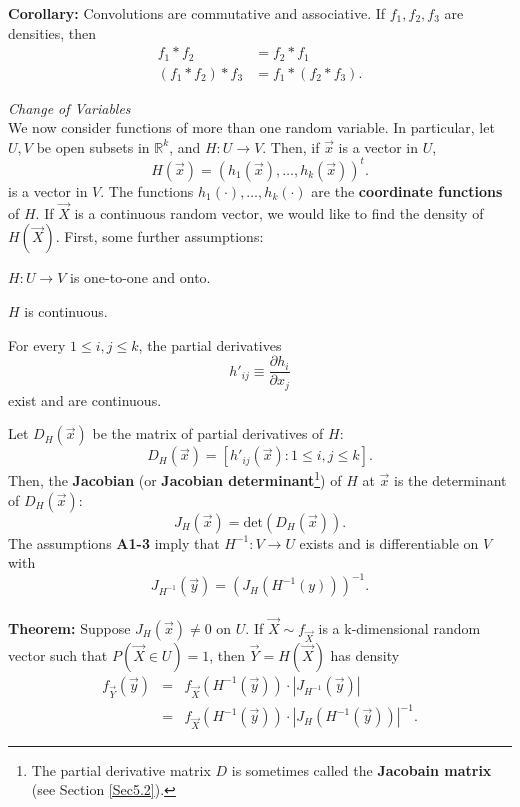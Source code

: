 \documentclass[12pt,oneside]{article}
\begin{document}
\noindent \textbf{Corollary:} Convolutions are commutative and associative.  If $f_1,f_2,f_3$ are densities, then
\begin{align*}
f_1 \ast f_2 &= f_2 \ast f_1 \\
(f_1 \ast f_2) \ast f_3 &= f_1 \ast (f_2 \ast f_3).
\end{align*}




\noindent \emph{Change of Variables}\\

We now consider functions of more than one random variable.  In particular, let $U,V$ be open subsets in $\mathbb{R}^k$, and $H: U \rightarrow V$.  Then, if $\vec{x}$ is a vector in $U$,  \[ H(\vec{x}) = (h_1(\vec{x}) , \hdots,h_k(\vec{x}))^t. \]
is a vector in $V$.  The functions $h_1(\cdot), \hdots,h_k(\cdot)$ are the \textbf{coordinate functions} of $H$.  If $\vec{X}$ is a continuous random vector, we would like to find the density of $H(\vec{X})$. First, some further assumptions:

\begin{Assumptions}
\item $H: U \rightarrow V$ is one-to-one and onto.
\item $H$ is continuous.
\item For every $1 \leq i,j \leq k$, the partial derivatives \[h'_{ij} \equiv \frac{\partial h_i}{\partial x_j}\] exist and are continuous.
\end{Assumptions}

\noindent Let $D_H(\vec{x})$ be the matrix of partial derivatives of $H$:
\[D_H(\vec{x}) = [h'_{ij}(\vec{x}) : 1 \leq i,j \leq k] .\]
Then, the \textbf{Jacobian} (or \textbf{Jacobian determinant}\footnote{The partial derivative matrix $D$ is sometimes called the \textbf{Jacobain matrix} (see Section \ref{Sec5.2}).}) of $H$ at $\vec{x}$ is the determinant of $D_H(\vec{x})$: \[J_H(\vec{x}) = \mbox{det}(D_H(\vec{x})). \]
The assumptions \textbf{A1-3} imply that $H^{-1}: V \rightarrow U$ exists and is differentiable on $V$ with
\[J_{H^{-1}} (\vec{y}) = (J_H(H^{-1}(y)))^{-1}.\] \\

\noindent \textbf{Theorem:} Suppose $J_H(\vec{x}) \neq 0$ on $U$.  If $\vec{X} \sim f_{\vec{X}}$ is a k-dimensional random vector such that $P(\vec{X} \in U) = 1$, then $\vec{Y} = H(\vec{X})$ has density
\begin{eqnarray*}
f_{\vec{Y}}(\vec{y}) &=& f_{\vec{X}} (H^{-1}(\vec{y}))\cdot|J_{H^{-1}}(\vec{y})| \\ &=& f_{\vec{X}} (H^{-1}(\vec{y})) \cdot |J_H(H^{-1}(\vec{y}))|^{-1} .
\end{eqnarray*}
\end{document}
